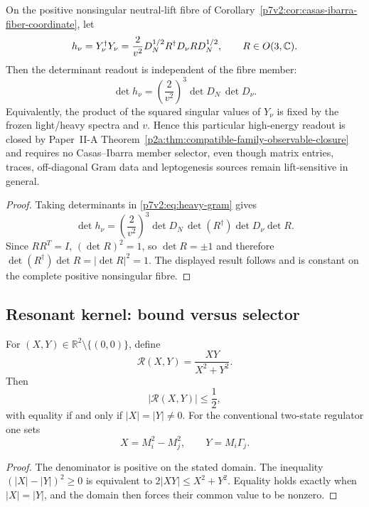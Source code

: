 \documentclass[11pt,a4paper]{article}
\begin{document}
\begin{theorem}
\label{p7v2:thm:neutral-lift-determinant-closure}
On the positive nonsingular neutral-lift fibre of
Corollary~\ref{p7v2:cor:casas-ibarra-fiber-coordinate}, let
\[
 h_\nu=Y_\nu^\dagger Y_\nu
 =\frac{2}{v^2}D_N^{1/2}R^\dagger D_\nu R D_N^{1/2},
 \qquad R\in O(3,\mathbb{C}).
\]
Then the determinant readout is independent of the fibre member:
\[
 \boxed{
 \det h_\nu
 =\left(\frac{2}{v^2}\right)^3
   \det D_N\,\det D_\nu .}
\]
Equivalently, the product of the squared singular values of $Y_\nu$ is fixed
by the frozen light/heavy spectra and $v$.  Hence this particular high-energy
readout is closed by Paper~II-A
Theorem~\ref{p2a:thm:compatible-family-observable-closure} and requires no
Casas--Ibarra member selector, even though matrix entries, traces, off-diagonal
Gram data and leptogenesis sources remain lift-sensitive in general.
\end{theorem}

\begin{proof}
Taking determinants in
\eqref{p7v2:eq:heavy-gram} gives
\[
 \det h_\nu
 =\left(\frac{2}{v^2}\right)^3
 \det D_N\,\det(R^\dagger)\det D_\nu\det R.
\]
Since $RR^T=I$, $(\det R)^2=1$, so $\det R=\pm1$ and therefore
$\det(R^\dagger)\det R=|\det R|^2=1$.  The displayed result follows and is
constant on the complete positive nonsingular fibre.
\end{proof}

\subsection{Resonant kernel: bound versus selector}
\label{p7v2:sec:resonant-bound}

\begin{theorem}
\label{p7v2:thm:resonant-bound}
For \((X,Y)\in\mathbb R^2\setminus\{(0,0)\}\), define
\begin{equation}
\label{p7v2:eq:resonant-factor}
 \mathcal R(X,Y)
 =
 \frac{XY}{X^2+Y^2}.
\end{equation}
Then
\begin{equation}
\label{p7v2:eq:resonant-bound}
 |\mathcal R(X,Y)|\leq\frac12,
\end{equation}
with equality if and only if \(|X|=|Y|\neq0\).  For the conventional
two-state regulator one sets
\[
 X=M_i^2-M_j^2,\qquad Y=M_i\Gamma_j.
\]
\end{theorem}

\begin{proof}
The denominator is positive on the stated domain.  The inequality
\((|X|-|Y|)^2\geq0\) is equivalent to
\(2|XY|\leq X^2+Y^2\).  Equality holds exactly when
\(|X|=|Y|\), and the domain then forces their common value to be nonzero.
\end{proof}
\end{document}
